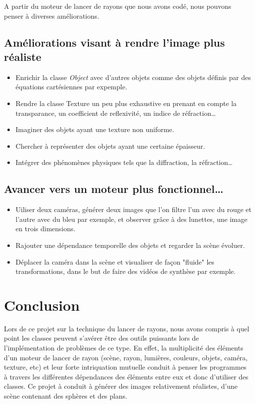 \documentclass{article}
\begin{document}
A partir du moteur de lancer de rayons que nous avons codé, nous pouvons penser à diverses améliorations.
\subsection{Améliorations visant à rendre l'image plus réaliste}
	\begin{itemize}
		\item Enrichir la classe \emph{Object} avec d'autres objets comme des objets définis par des équations cartésiennes par expemple.
		\item Rendre la classe Texture un peu plus exhaustive en prenant en compte la transparance, un coefficient de reflexivité, un indice de réfraction\dots
		\item Imaginer des objets ayant une texture non uniforme.
		\item Chercher à représenter des objets ayant une certaine épaisseur.
		\item Intégrer des phénomènes physiques tels que la diffraction, la réfraction\dots
	\end{itemize}

\subsection{Avancer vers un moteur plus fonctionnel\dots}
	\begin{itemize}
		\item Uiliser deux caméras, générer deux images que l'on filtre l'un avec du rouge et l'autre avec du bleu par exemple, et observer grâce à des lunettes, une image en trois dimensions.
		\item Rajouter une dépendance temporelle des objets et regarder la scène évoluer.
		\item Déplacer la caméra dans la scène et visualiser de façon "fluide" les transformations, dans le but de faire des vidéos de synthèse par exemple.
	\end{itemize}

\section{Conclusion}
Lors de ce projet sur la technique du lancer de rayons, nous avons compris à quel point les classes peuvent s'avérer être des outils puissants lors de l'implémentation de problèmes de ce type. En effet, la multiplicité des éléments d'un moteur de lancer de rayon (scène, rayon, lumières, couleurs, objets, caméra, texture, etc) et leur forte intriquation mutuelle conduit à penser les programmes à travers les différentes dépendances des éléments entre eux et donc d'utiliser des classes. Ce projet à conduit à générer des images relativement réalistes, d'une scène contenant des sphères et des plans.
	
\end{document}
